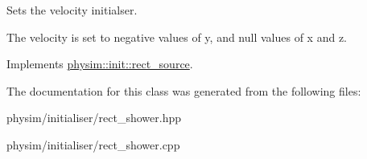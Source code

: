 Sets the velocity initialser. 

The velocity is set to negative values of y, and null values of x and z. 

Implements \hyperlink{classphysim_1_1init_1_1rect__source_a3b825bcedd2d622dabc10aa6a1252cbf}{physim\+::init\+::rect\+\_\+source}.



The documentation for this class was generated from the following files\+:\begin{DoxyCompactItemize}
\item 
physim/initialiser/rect\+\_\+shower.\+hpp\item 
physim/initialiser/rect\+\_\+shower.\+cpp\end{DoxyCompactItemize}
